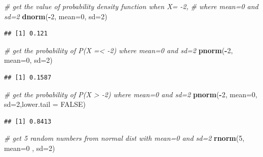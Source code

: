 \documentclass[12pt,]{krantz}
\newenvironment{Shaded}{\begin{snugshade}}{\end{snugshade}}
\newcommand{\CommentTok}[1]{\textcolor[rgb]{0.56,0.35,0.01}{\textit{#1}}}
\newcommand{\DataTypeTok}[1]{\textcolor[rgb]{0.13,0.29,0.53}{#1}}
\newcommand{\DecValTok}[1]{\textcolor[rgb]{0.00,0.00,0.81}{#1}}
\newcommand{\KeywordTok}[1]{\textcolor[rgb]{0.13,0.29,0.53}{\textbf{#1}}}
\newcommand{\NormalTok}[1]{#1}
\newcommand{\OperatorTok}[1]{\textcolor[rgb]{0.81,0.36,0.00}{\textbf{#1}}}
\newcommand{\OtherTok}[1]{\textcolor[rgb]{0.56,0.35,0.01}{#1}}
\begin{document}
\begin{Shaded}
\begin{Highlighting}[]
\CommentTok{# get the value of probability density function when X= -2,}
\CommentTok{# where mean=0 and sd=2}
\KeywordTok{dnorm}\NormalTok{(}\OperatorTok{-}\DecValTok{2}\NormalTok{, }\DataTypeTok{mean=}\DecValTok{0}\NormalTok{, }\DataTypeTok{sd=}\DecValTok{2}\NormalTok{)}
\end{Highlighting}
\end{Shaded}

\begin{verbatim}
## [1] 0.121
\end{verbatim}

\begin{Shaded}
\begin{Highlighting}[]
\CommentTok{# get the probability of P(X =< -2) where mean=0 and sd=2}
\KeywordTok{pnorm}\NormalTok{(}\OperatorTok{-}\DecValTok{2}\NormalTok{, }\DataTypeTok{mean=}\DecValTok{0}\NormalTok{, }\DataTypeTok{sd=}\DecValTok{2}\NormalTok{)}
\end{Highlighting}
\end{Shaded}

\begin{verbatim}
## [1] 0.1587
\end{verbatim}

\begin{Shaded}
\begin{Highlighting}[]
\CommentTok{# get the probability of P(X > -2) where mean=0 and sd=2}
\KeywordTok{pnorm}\NormalTok{(}\OperatorTok{-}\DecValTok{2}\NormalTok{, }\DataTypeTok{mean=}\DecValTok{0}\NormalTok{, }\DataTypeTok{sd=}\DecValTok{2}\NormalTok{,}\DataTypeTok{lower.tail =} \OtherTok{FALSE}\NormalTok{)}
\end{Highlighting}
\end{Shaded}

\begin{verbatim}
## [1] 0.8413
\end{verbatim}

\begin{Shaded}
\begin{Highlighting}[]
\CommentTok{# get 5 random numbers from normal dist with  mean=0 and sd=2}
\KeywordTok{rnorm}\NormalTok{(}\DecValTok{5}\NormalTok{, }\DataTypeTok{mean=}\DecValTok{0}\NormalTok{ , }\DataTypeTok{sd=}\DecValTok{2}\NormalTok{)}
\end{Highlighting}
\end{Shaded}
\end{document}
